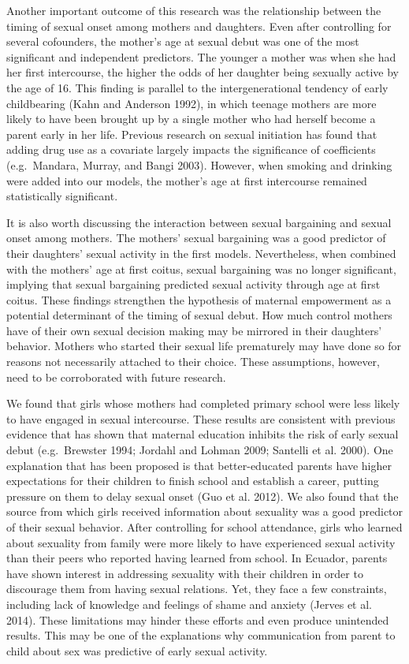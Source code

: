 \documentclass[
]{article}
\begin{document}
Another important outcome of this research was the relationship between
the timing of sexual onset among mothers and daughters. Even after
controlling for several cofounders, the mother's age at sexual debut was
one of the most significant and independent predictors. The younger a
mother was when she had her first intercourse, the higher the odds of
her daughter being sexually active by the age of 16. This finding is
parallel to the intergenerational tendency of early childbearing (Kahn
and Anderson 1992), in which teenage mothers are more likely to have
been brought up by a single mother who had herself become a parent early
in her life. Previous research on sexual initiation has found that
adding drug use as a covariate largely impacts the significance of
coefficients (e.g.~Mandara, Murray, and Bangi 2003). However, when
smoking and drinking were added into our models, the mother's age at
first intercourse remained statistically significant.

It is also worth discussing the interaction between sexual bargaining
and sexual onset among mothers. The mothers' sexual bargaining was a
good predictor of their daughters' sexual activity in the first models.
Nevertheless, when combined with the mothers' age at first coitus,
sexual bargaining was no longer significant, implying that sexual
bargaining predicted sexual activity through age at first coitus. These
findings strengthen the hypothesis of maternal empowerment as a
potential determinant of the timing of sexual debut. How much control
mothers have of their own sexual decision making may be mirrored in
their daughters' behavior. Mothers who started their sexual life
prematurely may have done so for reasons not necessarily attached to
their choice. These assumptions, however, need to be corroborated with
future research.

We found that girls whose mothers had completed primary school were less
likely to have engaged in sexual intercourse. These results are
consistent with previous evidence that has shown that maternal education
inhibits the risk of early sexual debut (e.g.~Brewster 1994; Jordahl and
Lohman 2009; Santelli et al. 2000). One explanation that has been
proposed is that better-educated parents have higher expectations for
their children to finish school and establish a career, putting pressure
on them to delay sexual onset (Guo et al. 2012). We also found that the
source from which girls received information about sexuality was a good
predictor of their sexual behavior. After controlling for school
attendance, girls who learned about sexuality from family were more
likely to have experienced sexual activity than their peers who reported
having learned from school. In Ecuador, parents have shown interest in
addressing sexuality with their children in order to discourage them
from having sexual relations. Yet, they face a few constraints,
including lack of knowledge and feelings of shame and anxiety (Jerves et
al. 2014). These limitations may hinder these efforts and even produce
unintended results. This may be one of the explanations why
communication from parent to child about sex was predictive of early
sexual activity.
\end{document}
